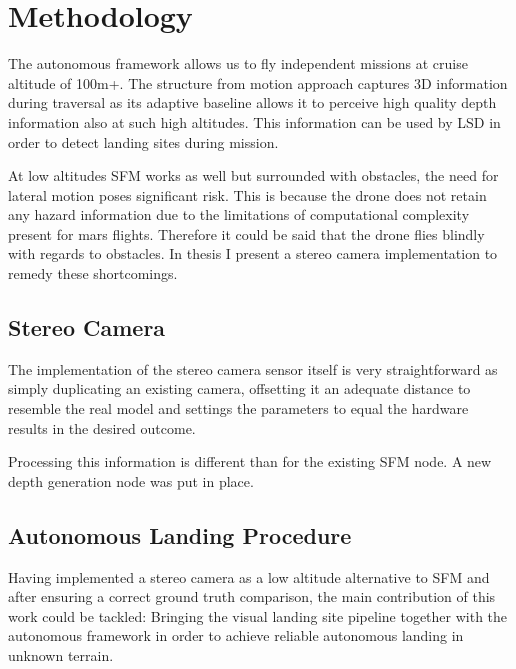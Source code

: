 \chapter{Methodology}
\label{sec:methodology}

The autonomous framework\citep{Autonomy} allows us to fly independent missions at cruise altitude of 100m+. The structure from motion approach captures 3D information during traversal as its adaptive baseline allows it to perceive high quality depth information also at such high altitudes. This information can be used by LSD in order to detect landing sites during mission. 

At low altitudes SFM works as well but surrounded with obstacles, the need for lateral motion poses significant risk. This is because the drone does not retain any hazard information due to the limitations of computational complexity present for mars flights. Therefore it could be said that the drone flies blindly with regards to obstacles. In thesis I present a stereo camera implementation to remedy these shortcomings.

\section{Stereo Camera}

The implementation of the stereo camera sensor itself is very straightforward as simply duplicating an existing camera, offsetting it an adequate distance to resemble the real model and settings the parameters to equal the hardware results in the desired outcome.

Processing this information is different than for the existing SFM node. A new depth generation node was put in place.

\section{Autonomous Landing Procedure}

Having implemented a stereo camera as a low altitude alternative to SFM and after ensuring a correct ground truth comparison, the main contribution of this work could be tackled: Bringing the visual landing site pipeline together with the autonomous framework in order to achieve reliable autonomous landing in unknown terrain.